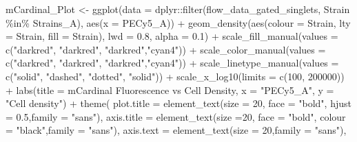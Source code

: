 \documentclass[
]{article}
\newenvironment{Shaded}{\begin{snugshade}}{\end{snugshade}}
\newcommand{\AttributeTok}[1]{\textcolor[rgb]{0.77,0.63,0.00}{#1}}
\newcommand{\DecValTok}[1]{\textcolor[rgb]{0.00,0.00,0.81}{#1}}
\newcommand{\FloatTok}[1]{\textcolor[rgb]{0.00,0.00,0.81}{#1}}
\newcommand{\FunctionTok}[1]{\textcolor[rgb]{0.00,0.00,0.00}{#1}}
\newcommand{\NormalTok}[1]{#1}
\newcommand{\OtherTok}[1]{\textcolor[rgb]{0.56,0.35,0.01}{#1}}
\newcommand{\SpecialCharTok}[1]{\textcolor[rgb]{0.00,0.00,0.00}{#1}}
\newcommand{\StringTok}[1]{\textcolor[rgb]{0.31,0.60,0.02}{#1}}
\begin{document}
\begin{Shaded}
\begin{Highlighting}[]
\NormalTok{mCardinal\_Plot }\OtherTok{\textless{}{-}} \FunctionTok{ggplot}\NormalTok{(}\AttributeTok{data =}\NormalTok{ dplyr}\SpecialCharTok{::}\FunctionTok{filter}\NormalTok{(flow\_data\_gated\_singlets, Strain }\SpecialCharTok{\%in\%}\NormalTok{ Strains\_A), }\FunctionTok{aes}\NormalTok{(}\AttributeTok{x =}\NormalTok{ PECy5\_A)) }\SpecialCharTok{+}
  \FunctionTok{geom\_density}\NormalTok{(}\FunctionTok{aes}\NormalTok{(}\AttributeTok{colour =}\NormalTok{ Strain, }\AttributeTok{lty =}\NormalTok{ Strain, }\AttributeTok{fill =}\NormalTok{ Strain), }\AttributeTok{lwd =} \FloatTok{0.8}\NormalTok{, }\AttributeTok{alpha =} \FloatTok{0.1}\NormalTok{) }\SpecialCharTok{+}
  \FunctionTok{scale\_fill\_manual}\NormalTok{(}\AttributeTok{values =} \FunctionTok{c}\NormalTok{(}\StringTok{"darkred"}\NormalTok{, }\StringTok{"darkred"}\NormalTok{, }\StringTok{"darkred"}\NormalTok{,}\StringTok{"cyan4"}\NormalTok{)) }\SpecialCharTok{+} 
  \FunctionTok{scale\_color\_manual}\NormalTok{(}\AttributeTok{values =} \FunctionTok{c}\NormalTok{(}\StringTok{"darkred"}\NormalTok{, }\StringTok{"darkred"}\NormalTok{, }\StringTok{"darkred"}\NormalTok{,}\StringTok{"cyan4"}\NormalTok{)) }\SpecialCharTok{+}
  \FunctionTok{scale\_linetype\_manual}\NormalTok{(}\AttributeTok{values =} \FunctionTok{c}\NormalTok{(}\StringTok{"solid"}\NormalTok{, }\StringTok{"dashed"}\NormalTok{, }\StringTok{"dotted"}\NormalTok{, }\StringTok{"solid"}\NormalTok{)) }\SpecialCharTok{+}
  \FunctionTok{scale\_x\_log10}\NormalTok{(}\AttributeTok{limits =} \FunctionTok{c}\NormalTok{(}\DecValTok{100}\NormalTok{, }\DecValTok{200000}\NormalTok{)) }\SpecialCharTok{+}
  \FunctionTok{labs}\NormalTok{(}\AttributeTok{title =} \StringTok{\textquotesingle{}mCardinal Fluorescence vs Cell Density\textquotesingle{}}\NormalTok{, }\AttributeTok{x =} \StringTok{"PECy5\_A"}\NormalTok{, }\AttributeTok{y =} \StringTok{"Cell density"}\NormalTok{) }\SpecialCharTok{+}
  \FunctionTok{theme}\NormalTok{(}
    \AttributeTok{plot.title =} \FunctionTok{element\_text}\NormalTok{(}\AttributeTok{size =} \DecValTok{20}\NormalTok{, }\AttributeTok{face =} \StringTok{"bold"}\NormalTok{, }\AttributeTok{hjust =} \FloatTok{0.5}\NormalTok{,}\AttributeTok{family =} \StringTok{"sans"}\NormalTok{),}
    \AttributeTok{axis.title =} \FunctionTok{element\_text}\NormalTok{(}\AttributeTok{size =}\DecValTok{20}\NormalTok{, }\AttributeTok{face =} \StringTok{"bold"}\NormalTok{, }\AttributeTok{colour =} \StringTok{"black"}\NormalTok{,}\AttributeTok{family =} \StringTok{"sans"}\NormalTok{),}
    \AttributeTok{axis.text =} \FunctionTok{element\_text}\NormalTok{(}\AttributeTok{size =} \DecValTok{20}\NormalTok{,}\AttributeTok{family =} \StringTok{"sans"}\NormalTok{),}

\end{Highlighting}
\end{Shaded}
\end{document}
